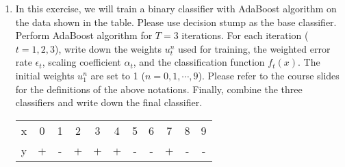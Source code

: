 \documentclass[12pt, a4paper]{article}
\begin{document}
\begin{enumerate}
\item In this exercise, we will train a binary classifier with AdaBoost algorithm
on the data shown in the table. Please use decision stump as the base classifier. Perform
AdaBoost algorithm for $T = 3$ iterations. For each iteration ($t = 1, 2, 3$), write down
the weights $u^n_t$ used for training, the weighted error rate $\epsilon_t$, scaling coefficient $\alpha_t$, and the classification function $f_t(x)$. The initial weights $u^n_1$ are set to 1 ($n = 0, 1, \cdots, 9$). Please refer to the course slides for the definitions of the above notations. Finally, combine the three classifiers and write down the final classifier.
\begin{table}[H]
    \centering
    \begin{tabular}{c|cccccccccc}\hline
        x&0&1&2&3&4&5&6&7&8&9\\
        y&+&-&+&+&+&-&-&+&-&-\\ \hline
    \end{tabular}
\end{table}


\end{enumerate}
\end{document}
